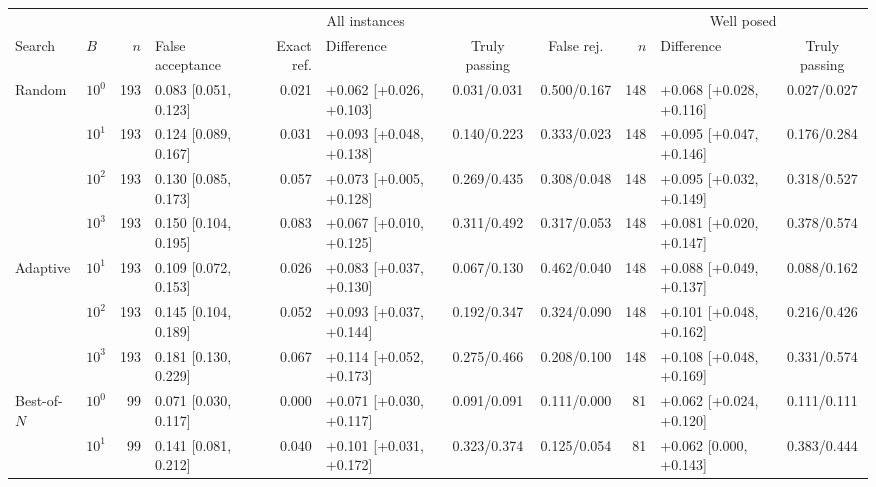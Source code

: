 \setlength{\tabcolsep}{1.2pt}
\begin{tabular*}{\textwidth}{@{\extracolsep{\fill}}llrlrlccrlc@{}}
\toprule
& & \multicolumn{6}{c}{All instances} & \multicolumn{3}{c}{Well posed} \\
\cmidrule(lr){3-8}\cmidrule(l){9-11}
Search & $B$ & $n$ & False acceptance & Exact ref. & Difference & Truly passing & False rej. & $n$ & Difference & Truly passing \\
\midrule
Random & $10^{0}$ & 193 & 0.083 {\tiny[0.051, 0.123]} & 0.021 & +0.062 {\tiny[+0.026, +0.103]} & 0.031/0.031 & 0.500/0.167 & 148 & +0.068 {\tiny[+0.028, +0.116]} & 0.027/0.027 \\
 & $10^{1}$ & 193 & 0.124 {\tiny[0.089, 0.167]} & 0.031 & +0.093 {\tiny[+0.048, +0.138]} & 0.140/0.223 & 0.333/0.023 & 148 & +0.095 {\tiny[+0.047, +0.146]} & 0.176/0.284 \\
 & $10^{2}$ & 193 & 0.130 {\tiny[0.085, 0.173]} & 0.057 & +0.073 {\tiny[+0.005, +0.128]} & 0.269/0.435 & 0.308/0.048 & 148 & +0.095 {\tiny[+0.032, +0.149]} & 0.318/0.527 \\
 & $10^{3}$ & 193 & 0.150 {\tiny[0.104, 0.195]} & 0.083 & +0.067 {\tiny[+0.010, +0.125]} & 0.311/0.492 & 0.317/0.053 & 148 & +0.081 {\tiny[+0.020, +0.147]} & 0.378/0.574 \\
\addlinespace[2pt]
Adaptive & $10^{1}$ & 193 & 0.109 {\tiny[0.072, 0.153]} & 0.026 & +0.083 {\tiny[+0.037, +0.130]} & 0.067/0.130 & 0.462/0.040 & 148 & +0.088 {\tiny[+0.049, +0.137]} & 0.088/0.162 \\
 & $10^{2}$ & 193 & 0.145 {\tiny[0.104, 0.189]} & 0.052 & +0.093 {\tiny[+0.037, +0.144]} & 0.192/0.347 & 0.324/0.090 & 148 & +0.101 {\tiny[+0.048, +0.162]} & 0.216/0.426 \\
 & $10^{3}$ & 193 & 0.181 {\tiny[0.130, 0.229]} & 0.067 & +0.114 {\tiny[+0.052, +0.173]} & 0.275/0.466 & 0.208/0.100 & 148 & +0.108 {\tiny[+0.048, +0.169]} & 0.331/0.574 \\
\addlinespace[2pt]
Best-of-$N$ & $10^{0}$ & 99 & 0.071 {\tiny[0.030, 0.117]} & 0.000 & +0.071 {\tiny[+0.030, +0.117]} & 0.091/0.091 & 0.111/0.000 & 81 & +0.062 {\tiny[+0.024, +0.120]} & 0.111/0.111 \\
 & $10^{1}$ & 99 & 0.141 {\tiny[0.081, 0.212]} & 0.040 & +0.101 {\tiny[+0.031, +0.172]} & 0.323/0.374 & 0.125/0.054 & 81 & +0.062 {\tiny[0.000, +0.143]} & 0.383/0.444 \\

\end{tabular*}

